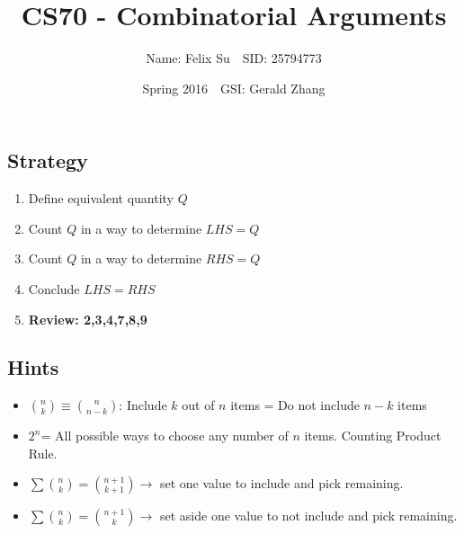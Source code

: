 \documentclass{article}\usepackage{amsmath,amssymb,amsthm,tikz,tkz-graph,color,chngpage,soul,hyperref,csquotes,graphicx,floatrow, listings}\newcommand*{\QEDB}{\hfill\ensuremath{\square}}\newtheorem*{prop}{Proposition}\renewcommand{\theenumi}{\alph{enumi}}\usepackage[shortlabels]{enumitem}\usepackage[nobreak=true]{mdframed}\usetikzlibrary{matrix,calc}\MakeOuterQuote{"}\usepackage[margin=0.75in]{geometry} \newtheorem{theorem}{Theorem}\newcommand{\Z}{\mathbb Z}\newcommand{\R}{\mathbb R}\newcommand{\Q}{\mathbb Q}\newcommand{\N}{\mathbb N}\newcommand{\x}[1]{\textrm{ #1 }}\newcommand{\pr}{\textrm{Pr}}
\title{CS70 - Combinatorial Arguments}
\author{Name: Felix Su$\quad$SID: 25794773}
\date{Spring 2016$\quad$GSI: Gerald Zhang}
\begin{document}
\maketitle

\subsection*{Strategy}
\begin{enumerate}[1.]
    \item Define equivalent quantity $Q$
    \item Count $Q$ in a way to determine $LHS=Q$
    \item Count $Q$ in a way to determine $RHS=Q$
    \item Conclude $LHS=RHS$
    \item \textbf{Review: 2,3,4,7,8,9}
\end{enumerate}
\subsection*{Hints}
\begin{itemize}
    \item $\binom{n}{k}\equiv\binom{n}{n-k}$: Include $k$ out of $n$ items = Do not include $n-k$ items
    \item $2^n$= All possible ways to choose any number of $n$ items. Counting Product Rule.
    \item $\sum\binom{n}{k}=\binom{n+1}{k+1} \rightarrow$ set one value to include and pick remaining.
    \item $\sum\binom{n}{k}=\binom{n+1}{k} \rightarrow$ set aside one value to not include and pick remaining.
\end{itemize}
\end{document}
